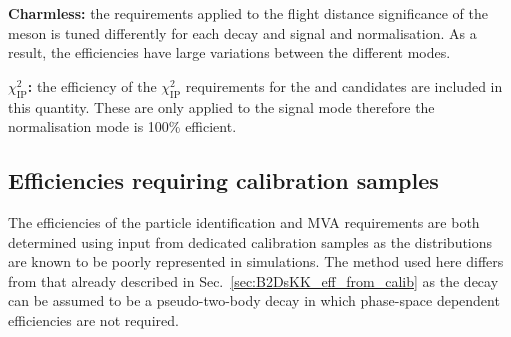 \begin{description}
\item \textbf{Charmless:} the requirements applied to the flight distance significance of the \Dsp meson is tuned differently for each \Dsp decay and signal and normalisation. As a result, the efficiencies have large variations between the different modes.

\item \textbf{$\chi^{2}_{\text{IP}}$:} the efficiency of the $\chi^{2}_{\text{IP}}$ requirements for the \Bp and \Dsp candidates are included in this quantity. These are only applied to the signal mode therefore the normalisation mode is 100\% efficient.

\end{description}





\subsection{Efficiencies requiring calibration samples}
\label{sec:B2DsPhi_eff_from_calib}

The efficiencies of the particle identification and MVA requirements are both determined using input from dedicated calibration samples as the distributions are known to be poorly represented in simulations. The method used here differs from that already described in Sec.~\ref{sec:B2DsKK_eff_from_calib} as the \decay{\Bp}{\Dsp\phiz} decay can be assumed to be a pseudo-two-body decay in which phase-space dependent efficiencies are not required. 

